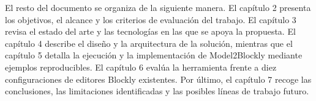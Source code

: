 El resto del documento se organiza de la siguiente manera. El capítulo 2
presenta los objetivos, el alcance y los criterios de evaluación del trabajo. El
capítulo 3 revisa el estado del arte y las tecnologías en las que se apoya la
propuesta. El capítulo 4 describe el diseño y la arquitectura de la solución,
mientras que el capítulo 5 detalla la ejecución y la implementación de
Model2Blockly mediante ejemplos reproducibles. El capítulo 6 evalúa la
herramienta frente a diez configuraciones de editores Blockly existentes. Por
último, el capítulo 7 recoge las conclusiones, las limitaciones identificadas y
las posibles líneas de trabajo futuro.
